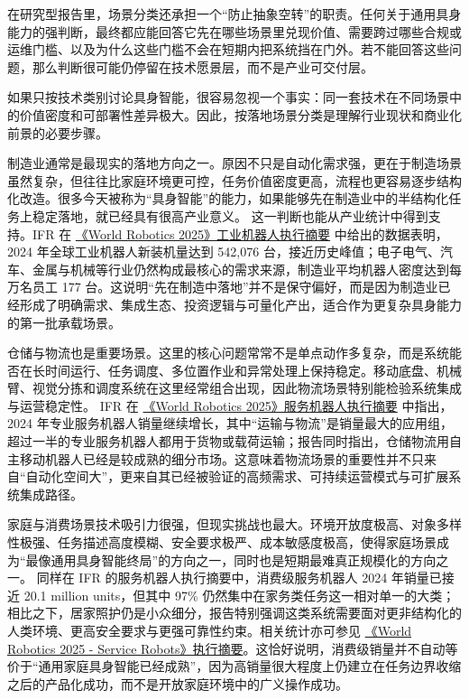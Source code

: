 在研究型报告里，场景分类还承担一个“防止抽象空转”的职责。任何关于通用具身能力的强判断，最终都应能回答它先在哪些场景里兑现价值、需要跨过哪些合规或运维门槛、以及为什么这些门槛不会在短期内把系统挡在门外。若不能回答这些问题，那么判断很可能仍停留在技术愿景层，而不是产业可交付层。

如果只按技术类别讨论具身智能，很容易忽视一个事实：同一套技术在不同场景中的价值密度和可部署性差异极大。因此，按落地场景分类是理解行业现状和商业化前景的必要步骤。

制造业通常是最现实的落地方向之一。原因不只是自动化需求强，更在于制造场景虽然复杂，但往往比家庭环境更可控，任务价值密度更高，流程也更容易逐步结构化改造。很多今天被称为“具身智能”的能力，如果能够先在制造业中的半结构化任务上稳定落地，就已经具有很高产业意义。 这一判断也能从产业统计中得到支持。IFR 在 \href{https://ifr.org/img/worldrobotics/Executive_Summary_WR_2025_Industrial_Robots.pdf}{《World Robotics 2025》工业机器人执行摘要} 中给出的数据表明，2024 年全球工业机器人新装机量达到 542,076 台，接近历史峰值；电子电气、汽车、金属与机械等行业仍然构成最核心的需求来源，制造业平均机器人密度达到每万名员工 177 台。这说明“先在制造中落地”并不是保守偏好，而是因为制造业已经形成了明确需求、集成生态、投资逻辑与可量化产出，适合作为更复杂具身能力的第一批承载场景。

仓储与物流也是重要场景。这里的核心问题常常不是单点动作多复杂，而是系统能否在长时间运行、任务调度、多位置作业和异常处理上保持稳定。移动底盘、机械臂、视觉分拣和调度系统在这里经常组合出现，因此物流场景特别能检验系统集成与运营稳定性。 IFR 在 \href{https://ifr.org/img/worldrobotics/Executive_Summary_WR_2025_Service_Robots.pdf}{《World Robotics 2025》服务机器人执行摘要} 中指出，2024 年专业服务机器人销量继续增长，其中“运输与物流”是销量最大的应用组，超过一半的专业服务机器人都用于货物或载荷运输；报告同时指出，仓储物流用自主移动机器人已经是较成熟的细分市场。这意味着物流场景的重要性并不只来自“自动化空间大”，更来自其已经被验证的高频需求、可持续运营模式与可扩展系统集成路径。

家庭与消费场景技术吸引力很强，但现实挑战也最大。环境开放度极高、对象多样性极强、任务描述高度模糊、安全要求极严、成本敏感度极高，使得家庭场景成为“最像通用具身智能终局”的方向之一，同时也是短期最难真正规模化的方向之一。 同样在 IFR 的服务机器人执行摘要中，消费级服务机器人 2024 年销量已接近 20.1 million units，但其中 97\% 仍然集中在家务类任务这一相对单一的大类；相比之下，居家照护仍是小众细分，报告特别强调这类系统需要面对更非结构化的人类环境、更高安全要求与更强可靠性约束。相关统计亦可参见 \href{https://ifr.org/img/worldrobotics/Executive_Summary_WR_2025_Service_Robots.pdf}{《World Robotics 2025 - Service Robots》执行摘要}。这恰好说明，消费级销量并不自动等价于“通用家庭具身智能已经成熟”，因为高销量很大程度上仍建立在任务边界收缩之后的产品化成功，而不是开放家庭环境中的广义操作成功。

